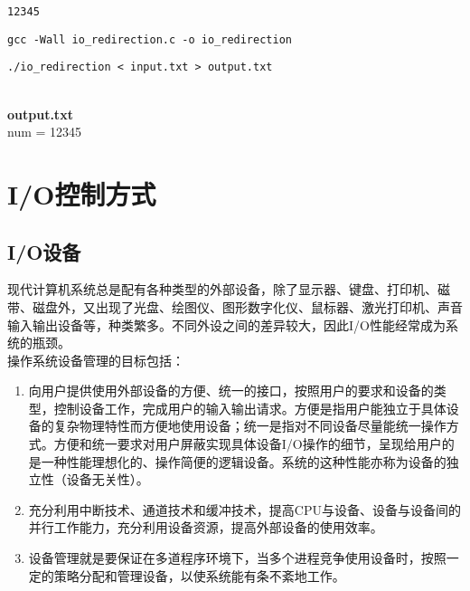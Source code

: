 \begin{lstlisting}[title=input.txt]
12345
\end{lstlisting}

\begin{lstlisting}[title=编译]
gcc -Wall io_redirection.c -o io_redirection
\end{lstlisting}

\begin{lstlisting}[title=运行]
./io_redirection < input.txt > output.txt
\end{lstlisting}

\begin{tcolorbox}
     \\
    \textbf{output.txt} \\
    num = 12345
\end{tcolorbox}

\newpage

\section{I/O控制方式}

\subsection{I/O设备}

现代计算机系统总是配有各种类型的外部设备，除了显示器、键盘、打印机、磁带、磁盘外，又出现了光盘、绘图仪、图形数字化仪、鼠标器、激光打印机、声音输入输出设备等，种类繁多。不同外设之间的差异较大，因此I/O性能经常成为系统的瓶颈。 \\

操作系统设备管理的目标包括：

\begin{enumerate}
    \item 向用户提供使用外部设备的方便、统一的接口，按照用户的要求和设备的类型，控制设备工作，完成用户的输入输出请求。方便是指用户能独立于具体设备的复杂物理特性而方便地使用设备；统一是指对不同设备尽量能统一操作方式。方便和统一要求对用户屏蔽实现具体设备I/O操作的细节，呈现给用户的是一种性能理想化的、操作简便的逻辑设备。系统的这种性能亦称为设备的独立性（设备无关性）。
    
    \item 充分利用中断技术、通道技术和缓冲技术，提高CPU与设备、设备与设备间的并行工作能力，充分利用设备资源，提高外部设备的使用效率。
    
    \item 设备管理就是要保证在多道程序环境下，当多个进程竞争使用设备时，按照一定的策略分配和管理设备，以使系统能有条不紊地工作。
\end{enumerate}

